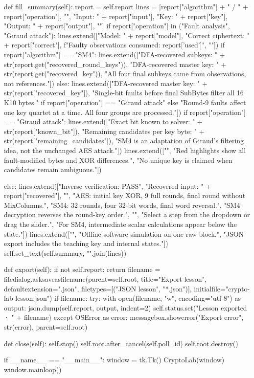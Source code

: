\begin{lightcode}[numbers=left,firstnumber=1]
    def fill_summary(self):
        report = self.report
        lines = [report["algorithm"] + " / " + report["operation"], "", "Input:  " + report["input"], "Key:    " + report["key"], "Output: " + report["output"], ""]
        if report["operation"] in ("Fault analysis", "Giraud attack"):
            lines.extend(["Model: " + report["model"], "Correct ciphertext: " + report["correct"], f"Faulty observations consumed: {report['used']}", ""])
            if report["algorithm"] == "SM4":
                lines.extend(["DFA-recovered subkeys: " + str(report.get("recovered_round_keys")), "DFA-recovered master key: " + str(report.get("recovered_key")), "All four final subkeys came from observations, not references."])
            else:
                lines.extend(["DFA-recovered master key: " + str(report["recovered_key"]), "Single-bit faults before final SubBytes filter all 16 K10 bytes." if report["operation"] == "Giraud attack" else "Round-9 faults affect one key quartet at a time. All four groups are processed."])
            if report["operation"] == "Giraud attack":
                lines.extend(["Exact bit known to solver: " + str(report["known_bit"]), "Remaining candidates per key byte: " + str(report["remaining_candidates"]), "SM4 is an adaptation of Giraud's filtering idea, not the unchanged AES attack."])
            lines.extend(["", "Red highlights show all fault-modified bytes and XOR differences.", "No unique key is claimed when candidates remain ambiguous."])

        else:
            lines.extend(["Inverse verification: PASS", "Recovered input: " + report["recovered"], "", "AES: initial key XOR, 9 full rounds, final round without MixColumns.", "SM4: 32 rounds, four 32-bit words, final word reversal.", "SM4 decryption reverses the round-key order.", "", "Select a step from the dropdown or drag the slider.", "For SM4, intermediate scalar calculations appear below the state."])
        lines.extend(["", "Offline software simulation on one raw block.", "JSON export includes the teaching key and internal states."])
        self.set_text(self.summary, "\n".join(lines))

    def export(self):
        if not self.report:
            return
        filename = filedialog.asksaveasfilename(parent=self.root, title="Export lesson", defaultextension=".json", filetypes=[("JSON lesson", "*.json")], initialfile="crypto-lab-lesson.json")
        if filename:
            try:
                with open(filename, "w", encoding="utf-8") as output:
                    json.dump(self.report, output, indent=2)
                self.status.set("Lesson exported · " + filename)
            except OSError as error:
                messagebox.showerror("Export error", str(error), parent=self.root)

    def close(self):
        self.stop()
        self.root.after_cancel(self.poll_id)
        self.root.destroy()


if __name__ == "__main__":
    window = tk.Tk()
    CryptoLab(window)
    window.mainloop()
\end{lightcode}
